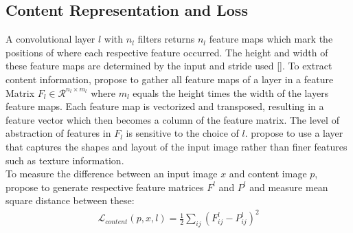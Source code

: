\documentclass{seminar}
\begin{document}
	\subsection{Content Representation and Loss}
	A convolutional layer $l$ with $n_l$ filters returns $n_l$ feature maps which mark the positions of where each respective feature occurred. The height and width of these feature maps are determined by the input and stride used [\cite{lecun1999object}]. To extract content information, \cite{gatys2015neural} propose to gather all feature maps of a layer in a feature Matrix $F_l\in\mathcal{R}^{n_l \times m_l}$ where $m_l$ equals the height times the width of the layers feature maps. Each feature map is vectorized and transposed, resulting in a feature vector which then becomes a column of the feature matrix. The level of abstraction of features in $F_l$ is sensitive to the choice of $l$. \cite{gatys2015neural} propose to use a layer that captures the shapes and layout of the input image rather than finer features such as texture information.\\
	To measure the difference between an input image $x$ and content image $p$, \cite{gatys2015neural} propose to generate respective feature matrices $F^l$ and $P^l$ and measure mean square distance between these:\\
	\begin{align}
	\mathcal{L}_{content}(p, x, l) = \frac{1}{2}\sum_{ij}(F^l_{ij} - P^l_{ij})^2
	\end{align}
	
	
	
\end{document}
